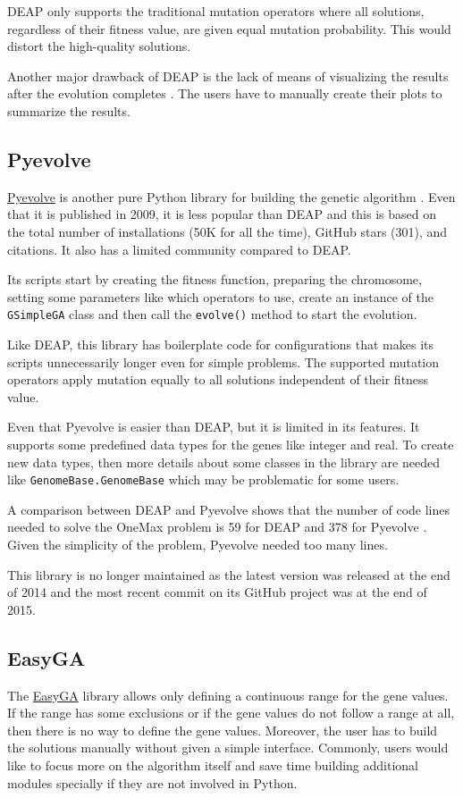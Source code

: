 \documentclass[conference]{IEEEtran}
\begin{document}
DEAP only supports the traditional mutation operators where all solutions, regardless of their fitness value, are given equal mutation probability. This would distort the high-quality solutions.

Another major drawback of DEAP is the lack of means of visualizing the results after the evolution completes \cite{DEAPReview}. The users have to manually create their plots to summarize the results.

\subsection{Pyevolve}
\label{pyevolve}
\href{http://pyevolve.sourceforge.net}{Pyevolve} is another pure Python library for building the genetic algorithm \cite{Pyevolve}. Even that it is published in 2009, it is less popular than DEAP and this is based on the total number of installations (50K for all the time), GitHub stars (301), and citations. It also has a limited community compared to DEAP. 

Its scripts start by creating the fitness function, preparing the chromosome, setting some parameters like which operators to use, create an instance of the \texttt{GSimpleGA} class and then call the \texttt{evolve()} method to start the evolution.

Like DEAP, this library has boilerplate code for configurations that makes its scripts unnecessarily longer even for simple problems. The supported mutation operators apply mutation equally to all solutions independent of their fitness value.

Even that Pyevolve is easier than DEAP, but it is limited in its features. It supports some predefined data types for the genes like integer and real. To create new data types, then more details about some classes in the library are needed like \texttt{GenomeBase.GenomeBase} which may be problematic for some users.

A comparison between DEAP and Pyevolve shows that the number of code lines needed to solve the OneMax problem is 59 for DEAP and 378 for Pyevolve \cite{DEAP}. Given the simplicity of the problem, Pyevolve needed too many lines.

This library is no longer maintained as the latest version was released at the end of 2014 and the most recent commit on its GitHub project was at the end of 2015.


\subsection{EasyGA}
\label{easyga}
The \href{https://github.com/danielwilczak101/EasyGA}{EasyGA} library allows only defining a continuous range for the gene values. If the range has some exclusions or if the gene values do not follow a range at all, then there is no way to define the gene values. Moreover, the user has to build the solutions manually without given a simple interface. Commonly, users would like to focus more on the algorithm itself and save time building additional modules specially if they are not involved in Python.
\end{document}

